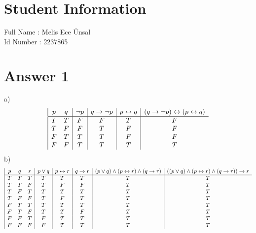 \documentclass[12pt]{article}
\begin{document}
\section*{Student Information } 
Full Name : Melis Ece Ünsal  \\
Id Number : 2237865 \\

\section*{Answer 1}
a)
\begin{displaymath}
\begin{array}{|c c|c|c|c|c}
p & q & \neg{p} & q \rightarrow \neg{p} & p\leftrightarrow q & (q \rightarrow \neg{p})\leftrightarrow (p\leftrightarrow q)\\ %
\hline %
T & T & F & F & T & F\\
T & F & F & T & F & F\\
F & T & T & T & F & F\\
F & F & T & T & T & T\\
\end{array}
\end{displaymath}
b)
\begin{displaymath}
\begin{array}{|c c c|c|c|c|c|c}
p & q & r & p \vee q & p\leftrightarrow r & q \rightarrow r & (p \vee q)\wedge(p\leftrightarrow r)\wedge(q \rightarrow r ) & ((p \vee q)\wedge(p\leftrightarrow r)\wedge(q \rightarrow r ))\rightarrow r \\ %
\hline %
T & T & T & T & T & T & T & T \\
T & T & F & T & F & F & T & T\\
T & F & T & T & T & T & T & T\\
T & F & F & T & F & T & T & T\\
F & T & T & T & T & T & T & T\\
F & T & F & T & T & F & T & T\\
F & F & T & F & T & T & T & T\\
F & F & F & F & T & T & T & T\\
\end{array}
\end{displaymath}
\end{document}
